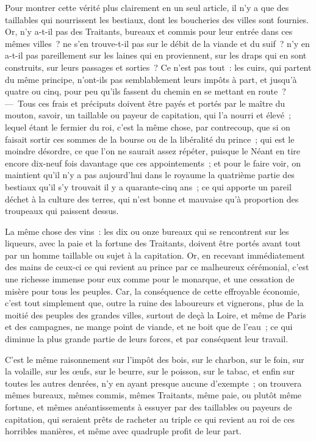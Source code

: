 \documentclass[french,twoside]{book} %
\begin{document}
Pour montrer cette vérité plus clairement en un seul article, il n’y a que des taillables qui nourrissent les bestiaux, dont les boucheries des villes sont fournies. Or, n’y a-t-il pas des Traitants, bureaux et commis pour leur entrée dans ces mêmes villes ? ne s’en trouve-t-il pas sur le débit de la viande et du suif ? n’y en a-t-il pas pareillement sur les laines qui en proviennent, sur les draps qui en sont construits, sur leurs passages et sorties ? Ce n’est pas tout : les cuirs, qui partent du même principe, n’ont-ils pas semblablement leurs impôts à part, et jusqu’à quatre ou cinq, pour peu qu’ils fassent du chemin en se mettant en route ? — Tous ces frais et préciputs doivent être payés et portés par le maître du mouton, savoir, un taillable ou payeur de capitation, qui l’a nourri et élevé ; lequel étant le fermier du roi, c’est la même chose, par contrecoup, que si on faisait sortir ces sommes de la bourse ou de la libéralité du prince ; qui est le moindre désordre, ce que l’on ne saurait assez répéter, puisque le Néant en tire encore dix-neuf fois davantage que ces appointements ; et pour le faire voir, on maintient qu’il n’y a pas aujourd’hui dans le royaume la quatrième partie des bestiaux qu’il s’y trouvait il y a quarante-cinq ans ; ce qui apporte un pareil déchet à la culture des terres, qui n’est bonne et mauvaise qu’à proportion des troupeaux qui paissent dessus.\par
La même chose des vins : les dix ou onze bureaux qui se rencontrent sur les liqueurs, avec la paie et la fortune des Traitants, doivent être portés avant tout par un homme taillable ou sujet à la capitation. Or, en recevant immédiatement des mains de ceux-ci ce qui revient au prince par ce malheureux cérémonial, c’est une richesse immense pour eux comme pour le monarque, et une cessation de misère pour tous les peuples. Car, la conséquence de cette effroyable économie, c’est tout simplement que, outre la ruine des laboureurs et vignerons, plus de la moitié des peuples des grandes villes, surtout de deçà la Loire, et même de Paris et des campagnes, ne mange point de viande, et ne boit que de l’eau ; ce qui diminue la plus grande partie de leurs forces, et par conséquent leur travail.\par
C’est le même raisonnement sur l’impôt des bois, sur le charbon, sur le foin, sur la volaille, sur les œufs, sur le beurre, sur le poisson, sur le tabac, et enfin sur toutes les autres denrées, n’y en ayant presque aucune d’exempte ; on trouvera mêmes bureaux, mêmes commis, mêmes Traitants, même paie, ou plutôt même fortune, et mêmes anéantissements à essuyer par des taillables ou payeurs de capitation, qui seraient prêts de racheter au triple ce qui revient au roi de ces horribles manières, et même avec quadruple profit de leur part.\par
\end{document}
